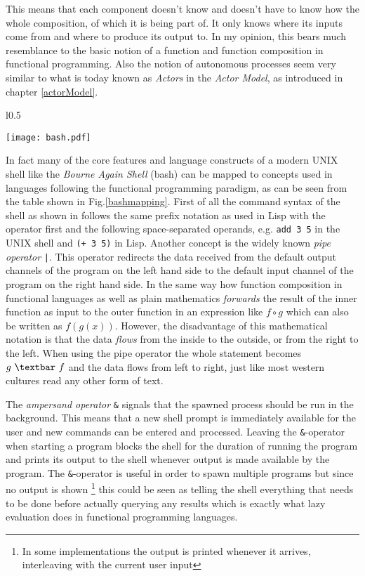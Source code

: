 This means that each component doesn't know and doesn't have to know
how the whole composition, of which it is being part of.
It only knows where its inputs come from and where to produce its
output to. In my opinion, this bears much resemblance to the basic
notion of a function and function composition in functional programming.
Also the notion of autonomous processes seem very similar to what
is today known as \textit{Actors} in the \textit{Actor Model},
as introduced in chapter \ref{actorModel}.

\begin{wrapfigure}{l}{0.5\textwidth}

  \texttt{[image: bash.pdf]}
  \caption{Mapping of concepts from the original UNIX shell to
          functional programming concepts.}
  \label{bashmapping}

\end{wrapfigure}

In fact many of the core features and language constructs of a modern
UNIX shell like the \textit{Bourne Again Shell} (bash) \cite{bash}
can be mapped to concepts used in languages following the
functional programming paradigm, as can be seen from the table
shown in Fig.\ref{bashmapping}. First of all the command syntax of the
shell as shown in \cite{unix78} follows the same prefix notation
as used in Lisp \cite{lisp86} with the operator first and the following
space-separated operands, e.g. \texttt{add 3 5} in the UNIX
shell and \texttt{(+ 3 5)} in Lisp.
Another concept is the widely known \textit{pipe operator} \texttt{|}.
This operator redirects the data received from the default output
channels of the program on the left hand side to the default input
channel of the program on the right hand side. In the same way how
function composition in functional languages as well as plain mathematics
\textit{forwards} the result of the inner function as input to the outer
function in an expression like $f \circ g$ which can also be written as
$f(g(x))$. However, the disadvantage of this mathematical notation
is that the data \textit{flows} from the inside to the outside, or
from the right to the left. When using the pipe operator the whole
statement becomes $g\ \textbar \ f$ and the data flows from left to right,
just like most western cultures read any other form of text.

The \textit{ampersand operator} \texttt{\&} signals that the spawned process
should be run in the background. This means that a new shell
prompt is immediately available for the user and new commands can be
entered and processed. Leaving the \texttt{\&}-operator when starting a program
blocks the shell for the duration of running the program and prints its
output to the shell whenever output is made available by the program.
The \texttt{\&}-operator is useful in order to spawn multiple programs but
since no output is shown \footnote{In some implementations the output
is printed whenever it arrives, interleaving with the current user
input} this could be seen as telling the shell
everything that needs to be done before actually querying any results
which is exactly what lazy evaluation does in functional programming
languages.


